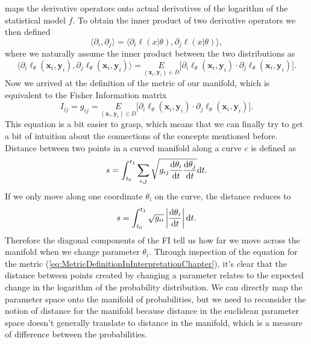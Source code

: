 maps the derivative operators onto actual derivatives of the logarithm of the statistical model $f$. To obtain the inner product of two derivative operators we then defined
\begin{equation}
	\langle \partial_i, \partial_j \rangle = \langle \partial_i \ell(x|\theta), \partial_j \ell(x|\theta) \rangle,
\end{equation}
where we naturally assume the inner product between the two distributions as
\begin{equation}
	 \langle \partial_i \ell_\theta(\mathbf{x}_i,\mathbf{y}_i), \partial_j \ell_\theta(\mathbf{x}_i,\mathbf{y}_i) \rangle = \underset{(\mathbf{x}_i,\mathbf{y}_i)\in D}{E} \big[\partial_i \ell_\theta(\mathbf{x}_i,\mathbf{y}_i) \cdot \partial_j \ell_\theta(\mathbf{x}_i,\mathbf{y}_i)\big].
\end{equation}
Now we arrived at the definition of the metric of our manifold, which is equivalent to the Fisher Information matrix
\begin{equation}\label{eq:MetricDefinitionInInterpretationChapter}
	I_{ij} = g_{ij} = \underset{(\mathbf{x}_i,\mathbf{y}_i)\in D}{E} \big[\partial_i \ell_\theta(\mathbf{x}_i,\mathbf{y}_i) \cdot \partial_j \ell_\theta(\mathbf{x}_i,\mathbf{y}_i)\big].
\end{equation}
This equation is a bit easier to grasp, which means that we can finally try to get a bit of intuition about the connections of the concepts mentioned before.\\
Distance between two points in a curved manifold along a curve $c$ is defined as 
\begin{equation}
	s = \int_{t_0}^{t_1} \sum_{i,j} \sqrt{g_{ij}\frac{\mathrm{d}\theta_i}{\mathrm{d}t}\frac{\mathrm{d}\theta_j}{\mathrm{d}t}} \mathrm{d}t. 
\end{equation}
If we only move along one coordinate $\theta_i$ on the curve, the distance reduces to 
\begin{equation}
	s = \int_{t_0}^{t_1} \sqrt{g_{ii}}\left|\frac{\mathrm{d}\theta_i}{\mathrm{d}t} \right| \mathrm{d}t. 
\end{equation}
Therefore the diagonal components of the FI tell us how far we move across the manifold when we change parameter $\theta_i$. Through inspection of the equation for the metric (\cref{eq:MetricDefinitionInInterpretationChapter}), it's clear that the distance between points created by changing a parameter relates to the expected change in the logarithm of the probability distribution. We can directly map the parameter space onto the manifold of probabilities, but we need to reconsider the notion of distance for the manifold because distance in the euclidean parameter space doesn't generally translate to distance in the manifold, which is a measure of difference between the probabilities.\\

